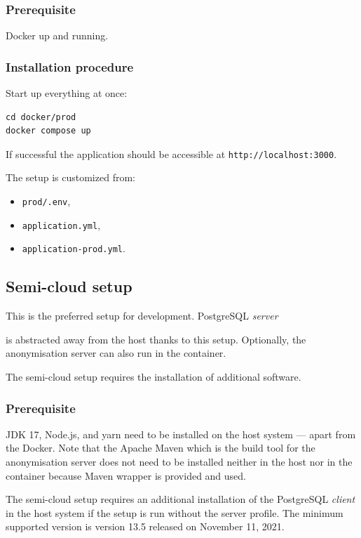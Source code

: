 \documentclass[a4paper,twoside,12pt]{book}
\newcommand{\ksremark}[1]{%
{%
{\color{brickred}{[#1]}}}%
\addcontentsline{rks}{uwagas}{\protect{#1}}%
}
\begin{document}
\subsubsection{Prerequisite}

Docker up and running.

\subsubsection{Installation procedure}

Start up everything at once:

\begin{verbatim}
cd docker/prod
docker compose up
\end{verbatim}

If successful the application should be accessible at \verb|http://localhost:3000|.

The setup is customized from:
\begin{itemize}
\item \verb|prod/.env|,
\item \verb|application.yml|,
\item \verb|application-prod.yml|.
\end{itemize}


\subsection{Semi-cloud setup}

This is the preferred setup for development. PostgreSQL \textit{server} \ksremark{bez kursywy} is abstracted away from the host thanks to this setup. Optionally, the anonymisation server can also run in the container.

The semi-cloud setup requires the installation of additional software.

\subsubsection{Prerequisite}

JDK 17, Node.js, and yarn need to be installed on the host system — apart from the Docker. Note that the Apache Maven which is the build tool for the anonymisation server does not need to be installed neither in the host nor in the container because Maven wrapper is provided and used.

The semi-cloud setup requires an additional installation of the PostgreSQL \textit{client} in the host system if the setup is run without the server profile. The minimum supported version is version 13.5 released on November 11, 2021.
\end{document}

